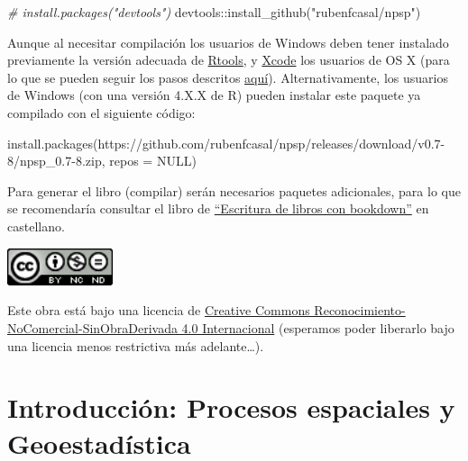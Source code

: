 \documentclass[
  spanish,
]{book}
\newenvironment{Shaded}{\begin{snugshade}}{\end{snugshade}}
\newcommand{\AttributeTok}[1]{\textcolor[rgb]{0.77,0.63,0.00}{#1}}
\newcommand{\CommentTok}[1]{\textcolor[rgb]{0.56,0.35,0.01}{\textit{#1}}}
\newcommand{\ConstantTok}[1]{\textcolor[rgb]{0.00,0.00,0.00}{#1}}
\newcommand{\FunctionTok}[1]{\textcolor[rgb]{0.00,0.00,0.00}{#1}}
\newcommand{\NormalTok}[1]{#1}
\newcommand{\SpecialCharTok}[1]{\textcolor[rgb]{0.00,0.00,0.00}{#1}}
\newcommand{\StringTok}[1]{\textcolor[rgb]{0.31,0.60,0.02}{#1}}
\theoremstyle{break}
\begin{document}
\begin{Shaded}
\begin{Highlighting}[]
\CommentTok{\# install.packages("devtools")}
\NormalTok{devtools}\SpecialCharTok{::}\FunctionTok{install\_github}\NormalTok{(}\StringTok{"rubenfcasal/npsp"}\NormalTok{)}
\end{Highlighting}
\end{Shaded}

Aunque al necesitar compilación los usuarios de Windows deben tener instalado previamente la versión adecuada de \href{https://cran.r-project.org/bin/windows/Rtools/}{Rtools}, y \href{https://apps.apple.com/us/app/xcode/id497799835}{Xcode} los usuarios de OS X
(para lo que se pueden seguir los pasos descritos \href{https://rubenfcasal.github.io/post/instalacion-de-r}{aquí}).
Alternativamente, los usuarios de Windows (con una versión 4.X.X de R) pueden instalar este paquete ya compilado con el siguiente código:

\begin{Shaded}
\begin{Highlighting}[]
\FunctionTok{install.packages}\NormalTok{(}\StringTok{\textquotesingle{}https://github.com/rubenfcasal/npsp/releases/download/v0.7{-}8/npsp\_0.7{-}8.zip\textquotesingle{}}\NormalTok{, }
                 \AttributeTok{repos =} \ConstantTok{NULL}\NormalTok{)}
\end{Highlighting}
\end{Shaded}

Para generar el libro (compilar) serán necesarios paquetes adicionales,
para lo que se recomendaría consultar el libro de \href{https://rubenfcasal.github.io/bookdown_intro}{``Escritura de libros con bookdown''} en castellano.

\includegraphics[width=1.22in]{images/by-nc-nd-88x31}

Este obra está bajo una licencia de \href{https://creativecommons.org/licenses/by-nc-nd/4.0/deed.es_ES}{Creative Commons Reconocimiento-NoComercial-SinObraDerivada 4.0 Internacional}
(esperamos poder liberarlo bajo una licencia menos restrictiva más adelante\ldots).

\hypertarget{intro-estesp}{%
\chapter{Introducción: Procesos espaciales y Geoestadística}\label{intro-estesp}}
\end{document}
